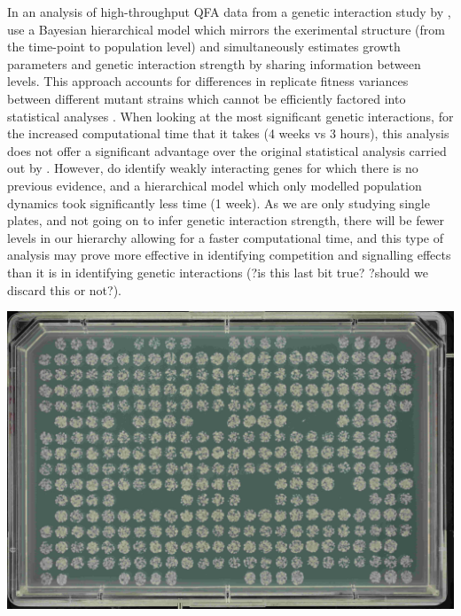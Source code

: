 In an analysis of high-throughput QFA data from a genetic interaction
study by \citet{Addinall2011}, \citet{Heydari2016} use a Bayesian
hierarchical model which mirrors the exerimental structure (from the
time-point to population level) and simultaneously estimates growth
parameters and genetic interaction strength by sharing information
between levels. This approach accounts for differences in replicate
fitness variances between different mutant strains which cannot be
efficiently factored into statistical analyses
\citep{Heydari2016}. When looking at the most significant genetic
interactions, for the increased computational time that it takes (4
weeks vs 3 hours), this analysis does not offer a significant
advantage over the original statistical analysis carried out by
\citet{Addinall2011}. However, \citet{Heydari2016} do identify weakly
interacting genes for which there is no previous evidence, and a
hierarchical model which only modelled population dynamics took
significantly less time (1 week). As we are only studying single
plates, and not going on to infer genetic interaction strength, there
will be fewer levels in our hierarchy allowing for a faster
computational time, and this type of analysis may prove more effective in
identifying competition and signalling effects than it is in identifying genetic
interactions (?is this last bit true? ?should we discard this or
not?).

\begin{Figure}
  \centering
  \includegraphics[width=\linewidth]{DLR00012647-2009-07-02_23-12-49}
  \label{fig:gaps}
\end{Figure}

